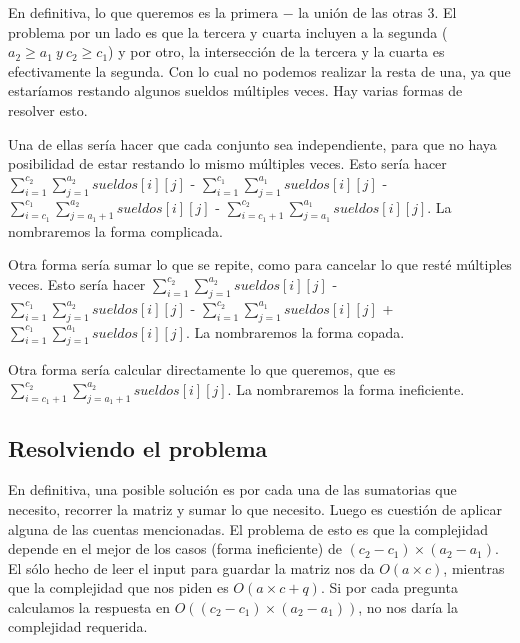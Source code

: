 En definitiva, lo que queremos es la primera $-$ la unión de las otras 3. El problema por un lado es que la tercera y cuarta incluyen a la segunda ($a_2 \geq a_1\ y\ c_2 \geq c_1$) y por otro, la intersección de la tercera y la cuarta es efectivamente la segunda. Con lo cual no podemos realizar la resta de una, ya que estaríamos restando algunos sueldos múltiples veces. Hay varias formas de resolver esto. \newline

Una de ellas sería hacer que cada conjunto sea independiente, para que no haya posibilidad de estar restando lo mismo múltiples veces. Esto sería hacer $\sum_{i = 1}^{c_2} \sum_{j = 1}^{a_2} sueldos[i][j]$ - $\sum_{i = 1}^{c_1} \sum_{j = 1}^{a_1} sueldos[i][j]$ - $\sum_{i = c_1}^{c_1} \sum_{j = a_1 + 1}^{a_2} sueldos[i][j]$ - $\sum_{i = c_1 + 1}^{c_2} \sum_{j = a_1}^{a_1} sueldos[i][j]$. La nombraremos la forma complicada.  \newline

Otra forma sería sumar lo que se repite, como para cancelar lo que resté múltiples veces. Esto sería hacer $\sum_{i = 1}^{c_2} \sum_{j = 1}^{a_2} sueldos[i][j]$ - $\sum_{i = 1}^{c_1} \sum_{j = 1}^{a_2} sueldos[i][j]$ - $\sum_{i = 1}^{c_2} \sum_{j = 1}^{a_1} sueldos[i][j]$ + $\sum_{i = 1}^{c_1} \sum_{j = 1}^{a_1} sueldos[i][j]$. La nombraremos la forma copada.  \newline

Otra forma sería calcular directamente lo que queremos, que es $\sum_{i = c_1 + 1}^{c_2} \sum_{j = a_1 + 1}^{a_2} sueldos[i][j]$. La nombraremos la forma ineficiente.

\subsection{Resolviendo el problema}

En definitiva, una posible solución es por cada una de las sumatorias que necesito, recorrer la matriz y sumar lo que necesito. Luego es cuestión de aplicar alguna de las cuentas mencionadas. El problema de esto es que la complejidad depende en el mejor de los casos (forma ineficiente) de $(c_2 - c_1) \times (a_2 - a_1)$. El sólo hecho de leer el input para guardar la matriz nos da $O(a \times c)$, mientras que la complejidad que nos piden es $O(a \times c + q)$. Si por cada pregunta calculamos la respuesta en $O((c_2 - c_1) \times (a_2 - a_1))$, no nos daría la complejidad requerida.  \newline

